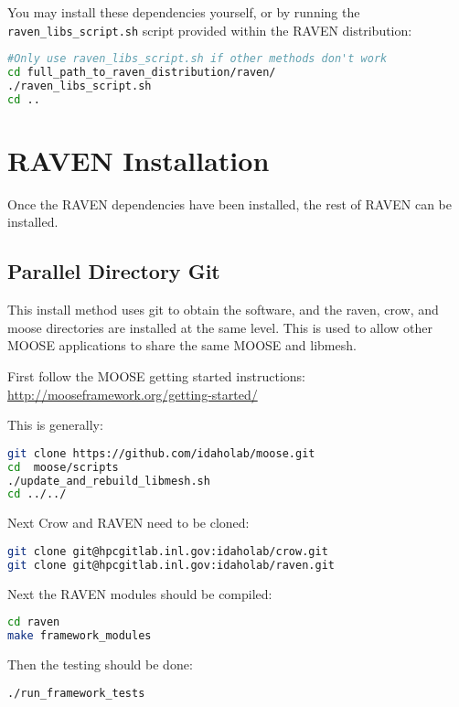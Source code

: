 You may install these dependencies yourself, or by running the
\texttt{raven\_libs\_script.sh} script provided within the RAVEN distribution:

\begin{lstlisting}[language=bash]
#Only use raven_libs_script.sh if other methods don't work
cd full_path_to_raven_distribution/raven/
./raven_libs_script.sh
cd ..
\end{lstlisting}

\section{RAVEN Installation}

Once the RAVEN dependencies have been installed, the rest of RAVEN can
be installed.

\subsection{Parallel Directory Git}

This install method uses git to obtain the software, and the raven,
crow, and moose directories are installed at the same level.  This is
used to allow other MOOSE applications to share the same MOOSE and
libmesh.

First follow the MOOSE getting started instructions:  \url{http://mooseframework.org/getting-started/}

This is generally:

\begin{lstlisting}[language=bash]
git clone https://github.com/idaholab/moose.git
cd  moose/scripts
./update_and_rebuild_libmesh.sh
cd ../../
\end{lstlisting}

Next Crow and RAVEN need to be cloned:

\begin{lstlisting}[language=bash]
git clone git@hpcgitlab.inl.gov:idaholab/crow.git
git clone git@hpcgitlab.inl.gov:idaholab/raven.git
\end{lstlisting}

Next the RAVEN modules should be compiled:

\begin{lstlisting}[language=bash]
cd raven
make framework_modules
\end{lstlisting}

Then the testing should be done:

\begin{lstlisting}[language=bash]
  ./run_framework_tests
\end{lstlisting}

